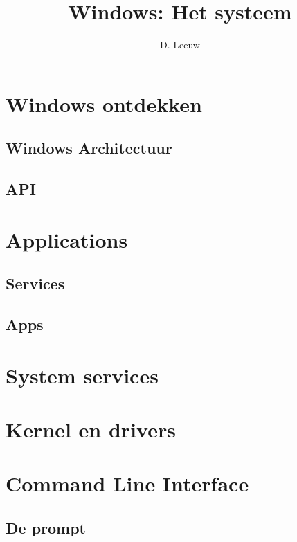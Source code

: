 \documentclass[a4paper,12pt,twoside,titlepage]{article}
\author{D. Leeuw}
\title{Windows: Het systeem}
\date{\today\\
0.0.0
\vfill
\raggedright
\copyright\ 2025 Dennis Leeuw\\
}
\begin{document}

\maketitle



\section{Windows ontdekken}


\subsection{Windows Architectuur}

\subsection{API}


\section{Applications}
\subsection{Services}

\subsection{Apps}


\section{System services}


\section{Kernel en drivers}


\section{Command Line Interface}

\subsection{De prompt}

\end{document}
